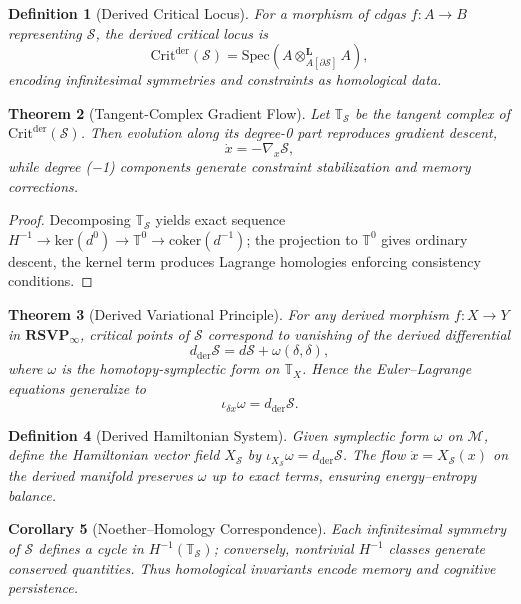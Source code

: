 \documentclass[12pt,a4paper,twoside,openright]{book}
\newtheorem{theorem}{Theorem}
\newtheorem{definition}[theorem]{Definition}
\newtheorem{corollary}[theorem]{Corollary}
\begin{document}
\begin{definition}[Derived Critical Locus]
For a morphism of cdgas $f\colon A\!\to\!B$ representing $\mathcal{S}$,
the \emph{derived critical locus} is
\[
\mathrm{Crit}^{\mathrm{der}}(\mathcal{S})
   = \mathrm{Spec}(A\!\otimes^{\mathbf{L}}_{A[\partial\mathcal{S}]}\!A),
\]
encoding infinitesimal symmetries and constraints as homological data.
\end{definition}

\begin{theorem}[Tangent-Complex Gradient Flow]
\label{thm:tangentflow}
Let $\mathbb{T}_\mathcal{S}$ be the tangent complex of $\mathrm{Crit}^{\mathrm{der}}(\mathcal{S})$.
Then evolution along its degree-0 part reproduces gradient descent,
\[
\dot{x} = -\nabla_x\mathcal{S},
\]
while degree (−1) components generate constraint stabilization and memory corrections.
\end{theorem}

\begin{proof}
Decomposing $\mathbb{T}_\mathcal{S}$ yields exact sequence
$H^{-1}\!\to\!\mathrm{ker}(d^0)\!\to\!\mathbb{T}^0\!\to\!\mathrm{coker}(d^{-1})$;
the projection to $\mathbb{T}^0$ gives ordinary descent, the kernel term produces Lagrange homologies enforcing consistency conditions.
\end{proof}

\begin{theorem}[Derived Variational Principle]
For any derived morphism $f\colon X\!\to\!Y$ in $\mathbf{RSVP}_\infty$,  
critical points of $\mathcal{S}$ correspond to vanishing of the derived differential
\[
d_{\mathrm{der}}\mathcal{S}
 = d\mathcal{S} + \omega(\delta,\delta),
\]
where $\omega$ is the homotopy-symplectic form on $\mathbb{T}_X$.  
Hence the Euler–Lagrange equations generalize to
\[
\iota_{\delta x}\omega = d_{\mathrm{der}}\mathcal{S}.
\]
\end{theorem}

\begin{definition}[Derived Hamiltonian System]
Given symplectic form $\omega$ on $\mathcal{M}$, define the Hamiltonian vector field
$X_\mathcal{S}$ by $\iota_{X_\mathcal{S}}\omega=d_{\mathrm{der}}\mathcal{S}$.
The flow $\dot{x}=X_\mathcal{S}(x)$ on the derived manifold preserves $\omega$ up to exact terms, ensuring energy–entropy balance.
\end{definition}

\begin{corollary}[Noether–Homology Correspondence]
Each infinitesimal symmetry of $\mathcal{S}$ defines a cycle in $H^{-1}(\mathbb{T}_\mathcal{S})$;
conversely, nontrivial $H^{-1}$ classes generate conserved quantities.  
Thus homological invariants encode memory and cognitive persistence.
\end{corollary}
\end{document}
